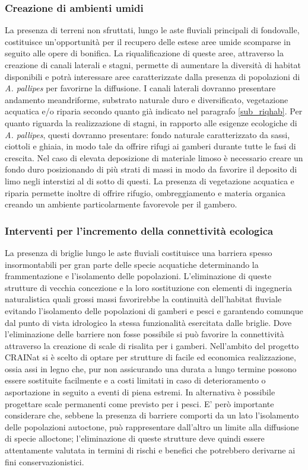 \documentclass[11pt,a4paper,italian,twoside,openany]{memoir}
\begin{document}
\subsubsection{Creazione di ambienti umidi}
La presenza di terreni non sfruttati, lungo le aste fluviali principali di fondovalle, costituisce un'opportunità per il recupero delle estese aree umide scomparse in seguito alle opere di bonifica. La riqualificazione di queste aree, attraverso la creazione di canali laterali e stagni, permette di aumentare la diversità di habitat disponibili e potrà interessare aree caratterizzate dalla presenza di popolazioni di \emph{A. pallipes} per favorirne la diffusione. I canali laterali dovranno presentare andamento meandriforme, substrato naturale duro e diversificato, vegetazione acquatica e/o riparia secondo quanto già indicato nel paragrafo \ref{sub_riqhab}. Per quanto riguarda la realizzazione di stagni, in rapporto alle esigenze ecologiche di \emph{A. pallipes}, questi dovranno presentare: fondo naturale caratterizzato da sassi, ciottoli e ghiaia, in modo tale da offrire rifugi ai gamberi durante tutte le fasi di crescita. Nel caso di elevata deposizione di materiale limoso è necessario creare un fondo duro posizionando di più strati di massi in modo da favorire il deposito di limo negli interstizi al di sotto di questi. La presenza di vegetazione acquatica e riparia permette inoltre di offrire rifugio, ombreggiamento e materia organica creando un ambiente particolarmente favorevole per il gambero. 

\subsubsection{Interventi per l'incremento della connettività ecologica}
La presenza di briglie lungo le aste fluviali costituisce una barriera spesso insormontabili per gran parte delle specie acquatiche determinando la frammentazione e l'isolamento delle popolazioni. L'eliminazione di queste strutture di vecchia concezione e la loro sostituzione con elementi di ingegneria naturalistica quali grossi massi favorirebbe la continuità dell'habitat fluviale evitando l'isolamento delle popolazioni di gamberi e pesci e garantendo comunque dal punto di vista idrologico la stessa funzionalità esercitata dalle briglie. Dove l'eliminazione delle barriere non fosse possibile si può favorire la connettività attraverso la creazione di scale di risalita per i gamberi. Nell'ambito del progetto CRAINat \cite{AA.VV. 2014} si è scelto di optare per strutture di facile ed economica realizzazione, ossia assi in legno che, pur non assicurando una durata a lungo termine possono essere sostituite facilmente e a costi limitati in caso di deterioramento o asportazione in seguito a eventi di piena estremi. In alternativa è possibile progettare scale permanenti come previsto per i pesci.  E' però importante considerare che, sebbene la presenza di barriere comporti da un lato l'isolamento delle popolazioni autoctone, può rappresentare dall'altro un limite alla diffusione di specie alloctone; l'eliminazione di queste strutture deve quindi essere attentamente valutata in termini di rischi e benefici che potrebbero derivarne ai fini conservazionistici.
\end{document}
